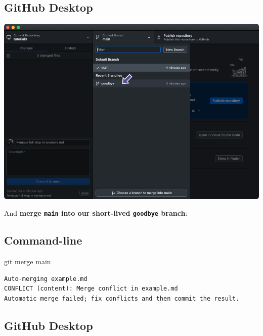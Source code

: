 \documentclass[
  letterpaper,
  DIV=11,
  numbers=noendperiod]{scrartcl}
\newenvironment{Shaded}{\begin{snugshade}}{\end{snugshade}}
\newcommand{\FunctionTok}[1]{\textcolor[rgb]{0.28,0.35,0.67}{#1}}
\newcommand{\NormalTok}[1]{\textcolor[rgb]{0.00,0.23,0.31}{#1}}
\begin{document}
\subsection{GitHub Desktop}

\includegraphics{images/image65.png}

And \textbf{merge \texttt{main} into our short-lived \texttt{goodbye}
branch}:

\subsection{Command-line}

\begin{Shaded}
\begin{Highlighting}[]
\FunctionTok{git}\NormalTok{ merge main}
\end{Highlighting}
\end{Shaded}

\begin{verbatim}
Auto-merging example.md
CONFLICT (content): Merge conflict in example.md
Automatic merge failed; fix conflicts and then commit the result.
\end{verbatim}

\subsection{GitHub Desktop}
\end{document}
